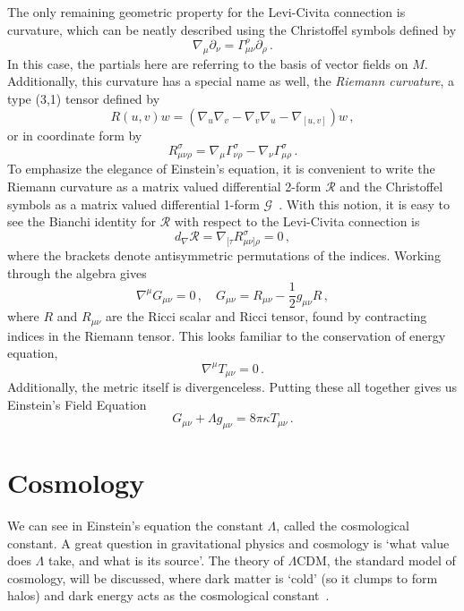 The only remaining geometric property for the Levi-Civita connection is curvature, which can be neatly described using the Christoffel symbols defined by
\begin{equation}
    \nabla_\mu\partial_\nu = \Gamma^{\rho}_{\mu\nu}\partial_\rho\,.
\end{equation}
In this case, the partials here are referring to the basis of vector fields on $M$. Additionally, this curvature has a special name as well, the \textit{Riemann curvature}, a type (3,1) tensor defined by
\begin{equation}
    R(u,v)w = (\nabla_u\nabla_v-\nabla_v\nabla_u - \nabla_{[u,v]})w\,,
\end{equation}
or in coordinate form by
\begin{equation}
    R_{\mu\nu\rho}^\sigma  = \nabla_\mu \Gamma^\sigma_{\nu\rho} - \nabla_\nu\Gamma^{\sigma}_{\mu\rho}\,.
\end{equation}
To emphasize the elegance of Einstein's equation, it is convenient to write the Riemann curvature as a matrix valued differential 2-form $\mathcal{R}$ and the Christoffel symbols as a matrix valued differential 1-form $\mathcal{G}$~\cite{baez_john_gauge_1994}. With this notion, it is easy to see the Bianchi identity for $\mathcal{R}$ with respect to the Levi-Civita connection is
\begin{equation}
    d_{\nabla}\mathcal{R} = \nabla_{[\tau}R^\sigma_{\mu\nu]\rho} = 0\,,
\end{equation}
where the brackets denote antisymmetric permutations of the indices. Working through the algebra gives
\begin{equation}
    \nabla^\mu G_{\mu\nu} = 0\,,\quad G_{\mu\nu} = R_{\mu\nu}-\frac{1}{2}g_{\mu\nu}R\,,
\end{equation}
where $R$ and $R_{\mu\nu}$ are the Ricci scalar and Ricci tensor, found by contracting indices in the Riemann tensor. This looks familiar to the conservation of energy equation,
\begin{equation}
    \nabla^\mu T_{\mu\nu}=0\,.
\end{equation}
Additionally, the metric itself is divergenceless. Putting these all together gives us Einstein's Field Equation
\begin{equation}
    G_{\mu\nu} + \Lambda g_{\mu\nu} = 8\pi\kappa T_{\mu\nu}\,.
\end{equation}

\section{Cosmology}
We can see in Einstein's equation the constant $\Lambda$, called the cosmological constant. A great question in gravitational physics and cosmology is `what value does $\Lambda$ take, and what is its source'. The theory of $\Lambda$CDM, the standard model of cosmology, will be discussed, where dark matter is `cold' (so it clumps to form halos) and dark energy acts as the cosmological constant~\cite{scott_dodelson_modern_2021}.

